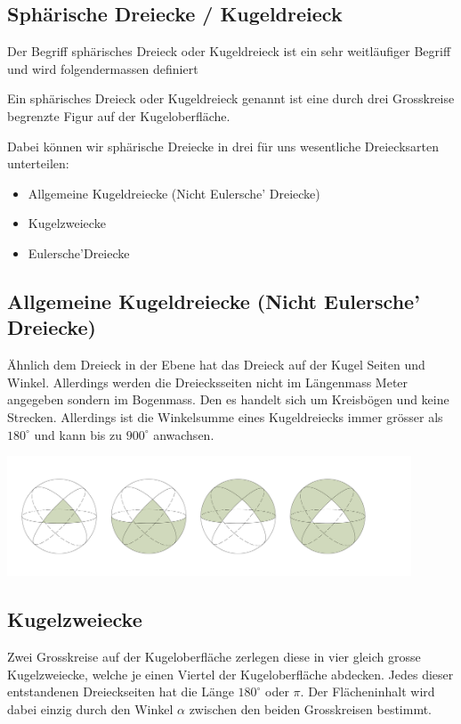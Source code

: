 \begin{refsection}
\section{Sphärische Dreiecke / Kugeldreieck}
Der Begriff sphärisches Dreieck oder Kugeldreieck ist ein sehr weitläufiger Begriff und wird folgendermassen definiert

\begin{definition}
Ein sphärisches Dreieck oder Kugeldreieck genannt ist eine durch drei Grosskreise begrenzte Figur auf der Kugeloberfläche.
\end{definition} 

Dabei können wir sphärische Dreiecke in drei für uns wesentliche Dreiecksarten unterteilen:

\begin{itemize}
\item Allgemeine Kugeldreiecke (Nicht Eulersche’ Dreiecke)
\item Kugelzweiecke
\item Eulersche’Dreiecke
\end{itemize}


\subsection{Allgemeine Kugeldreiecke (Nicht Eulersche’ Dreiecke)}
Ähnlich dem Dreieck in der Ebene hat das Dreieck auf der Kugel Seiten und Winkel. Allerdings werden die Dreiecksseiten nicht im Längenmass Meter angegeben sondern im Bogenmass. Den es handelt sich um Kreisbögen und keine Strecken.
Allerdings ist die Winkelsumme eines Kugeldreiecks immer grösser als $180^{\circ}$ und kann bis zu $900^{\circ}$ anwachsen.

\begin{center}
        \includegraphics[width=0.9\textwidth]{kugel/Dreiecksarten.jpg}
\end{center}


\subsection{Kugelzweiecke} 
Zwei Grosskreise auf der Kugeloberfläche zerlegen diese in vier gleich grosse Kugelzweiecke, welche je einen Viertel der Kugeloberfläche abdecken. 
Jedes dieser entstandenen Dreieckseiten hat die Länge
$180^{\circ}$ oder $\pi$.
Der Flächeninhalt wird dabei einzig durch den Winkel $\alpha$ zwischen den beiden Grosskreisen bestimmt.


\end{refsection}
